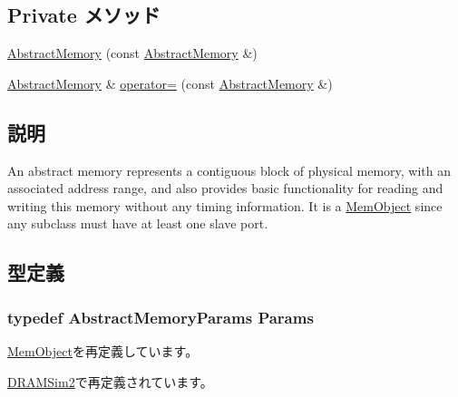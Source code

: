 \subsection*{Private メソッド}
\begin{DoxyCompactItemize}
\item 
\hyperlink{classAbstractMemory_abe7c4ad03729f9b3dd25d3dc43361103}{AbstractMemory} (const \hyperlink{classAbstractMemory_1_1AbstractMemory}{AbstractMemory} \&)
\item 
\hyperlink{classAbstractMemory_1_1AbstractMemory}{AbstractMemory} \& \hyperlink{classAbstractMemory_a8524c3be63882adac591f591519f3a3b}{operator=} (const \hyperlink{classAbstractMemory_1_1AbstractMemory}{AbstractMemory} \&)
\end{DoxyCompactItemize}


\subsection{説明}
An abstract memory represents a contiguous block of physical memory, with an associated address range, and also provides basic functionality for reading and writing this memory without any timing information. It is a \hyperlink{classMemObject}{MemObject} since any subclass must have at least one slave port. 

\subsection{型定義}
\hypertarget{classAbstractMemory_ab4fcbcbcfef78d6bc871995f8eca40eb}{
\subsubsection[{Params}]{\setlength{\rightskip}{0pt plus 5cm}typedef AbstractMemoryParams {\bf Params}}}
\label{classAbstractMemory_ab4fcbcbcfef78d6bc871995f8eca40eb}


\hyperlink{classMemObject_a905bbc621eeec0ed08859e21c8c95412}{MemObject}を再定義しています。

\hyperlink{classDRAMSim2_ae66665a06c9d64a6ba0e56d589b74d6c}{DRAMSim2}で再定義されています。

